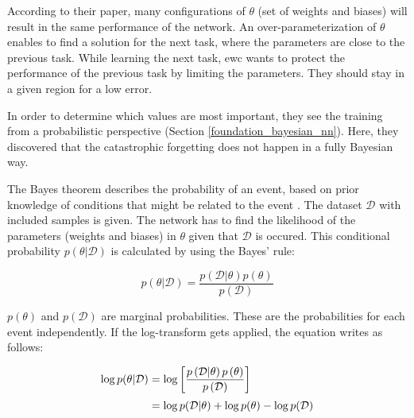 According to their paper, many configurations of $\theta$ (set of weights and biases) will result in the same performance of the network.
An over-parameterization of $\theta$ enables to find a solution for the next task, where the parameters are close to the previous task.
While learning the next task, \acrshort{ewc} wants to protect the performance of the previous task by limiting the parameters.
They should stay in a given region for a low error.
\cite{elastic-weight-consolidation}

In order to determine which values are most important, they see the training from a probabilistic perspective (Section \ref{foundation_bayesian_nn}).
Here, they discovered that the catastrophic forgetting does not happen in a fully Bayesian way.
\cite{elastic-weight-consolidation}

The Bayes theorem describes the probability of an event, based on prior knowledge of conditions that might be related to the event \cite{Bayes_theorem}. \cite{elastic-weight-consolidation, schaeffer_ewc}
\newline
The dataset $\mathcal{D}$ with included samples is given.
The network has to find the likelihood of the parameters (weights and biases) in $\theta$ given that $\mathcal{D}$ is occured.
This conditional probability $p \left(\theta | \mathcal{D} \right)$ is calculated by using the Bayes' rule: \cite{elastic-weight-consolidation, schaeffer_ewc}

\begin{equation}
    p \left( \theta | \mathcal{D} \right) = \frac{p \left(\mathcal{D}|\theta\right) p\left(\theta\right)}{p \left( \mathcal{D} \right)}
\end{equation}

$p \left( \theta \right)$ and $p \left( \mathcal{D} \right)$ are marginal probabilities. These are the probabilities for each event independently.
\newline
If the log-transform gets applied, the equation writes as follows: \cite{elastic-weight-consolidation, schaeffer_ewc}

\begin{equation}
    \setlength{\jot}{5pt}
    \begin{split}
        \log p(\theta | \mathcal{D}) & = \log \left[ 
                \frac{p \left(\mathcal{D}|\theta\right) p\left(\theta\right)}{p \left( \mathcal{D} \right)} 
            \right]
        \\
        & = \log p(\mathcal{D} | \theta) + \log p(\theta) - \log p(\mathcal{D})
    \end{split}
    \label{eq:bayes_applied_log}
\end{equation}

